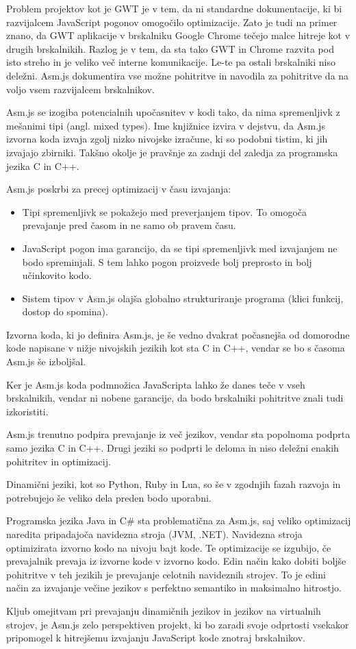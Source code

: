 Problem projektov kot je GWT je v tem, da ni standardne dokumentacije, ki bi razvijalcem JavaScript pogonov omogočilo optimizacije. Zato je tudi na primer znano, da GWT aplikacije v brskalniku Google Chrome tečejo malce hitreje kot v drugih brskalnikih. Razlog je v tem, da sta tako GWT in Chrome razvita pod isto streho in je veliko več interne komunikacije. Le-te pa ostali brskalniki niso deležni. Asm.js dokumentira vse možne pohitritve in navodila za pohitritve da na voljo vsem razvijalcem brskalnikov.

Asm.js se izogiba potencialnih upočasnitev v kodi tako, da nima spremenljivk z mešanimi tipi (angl. mixed types). Ime knjižnice izvira v dejstvu, da Asm.js izvorna koda izvaja zgolj nizko nivojske izračune, ki so podobni tistim, ki jih izvajajo zbirniki. Takšno okolje je pravšnje za zadnji del zaledja za programska jezika C in C++.

Asm.js poskrbi za precej optimizacij v času izvajanja:

\begin{itemize}
\item Tipi spremenljivk se pokažejo med preverjanjem tipov. To omogoča prevajanje pred časom in ne samo ob pravem času.
\item JavaScript pogon ima garancijo, da se tipi spremenljivk med izvajanjem ne bodo spreminjali. S tem lahko pogon proizvede bolj preprosto in bolj učinkovito kodo. 
\item Sistem tipov v Asm.js olajša globalno strukturiranje programa (klici funkcij, dostop do spomina).
\end{itemize}

Izvorna koda, ki jo definira Asm.js, je še vedno dvakrat počasnejša od domorodne kode napisane v nižje nivojskih jezikih kot sta C in C++, vendar se bo s časoma Asm.js še izboljšal.

Ker je Asm.js koda podmnožica JavaScripta lahko že danes teče v vseh brskalnikih, vendar ni nobene garancije, da bodo brskalniki pohitritve znali tudi izkoristiti.

Asm.js trenutno podpira prevajanje iz več jezikov, vendar sta popolnoma podprta samo jezika C in C++. Drugi jeziki so podprti le deloma in niso deležni enakih pohitritev in optimizacij.

Dinamični jeziki, kot so Python, Ruby in Lua, so še v zgodnjih fazah razvoja in potrebujejo še veliko dela preden bodo uporabni.

Programska jezika Java in C\# sta problematična za Asm.js, saj veliko optimizacij naredita pripadajoča navidezna stroja (JVM, .NET). Navidezna stroja optimizirata izvorno kodo na nivoju bajt kode. Te optimizacije se izgubijo, če prevajalnik prevaja iz izvorne kode v izvorno kodo. Edin način kako dobiti boljše pohitritve v teh jezikih je prevajanje celotnih navideznih strojev. To je edini način za izvajanje večine jezikov s perfektno semantiko in maksimalno hitrostjo.

Kljub omejitvam pri prevajanju dinamičnih jezikov in jezikov na virtualnih strojev, je Asm.js zelo perspektiven projekt, ki bo zaradi svoje odprtosti vsekakor pripomogel k hitrejšemu izvajanju JavaScript kode znotraj brskalnikov.
